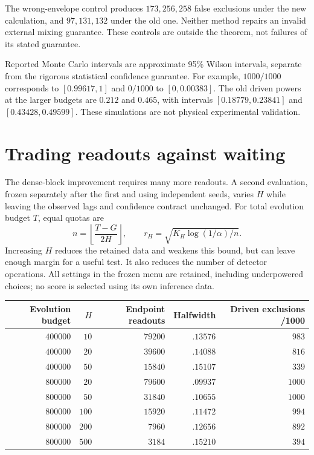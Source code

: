 The wrong-envelope control produces $173,256,258$ false exclusions under the
new calculation, and $97,131,132$ under the old one. Neither method repairs
an invalid external mixing guarantee. These controls are outside the theorem,
not failures of its stated guarantee.

Reported Monte Carlo intervals are approximate 95\% Wilson intervals,
separate from the rigorous statistical confidence guarantee. For example,
$1000/1000$ corresponds to $[0.99617,1]$ and $0/1000$ to $[0,0.00383]$.
The old driven powers at the larger budgets are $0.212$ and $0.465$, with
intervals $[0.18779,0.23841]$ and $[0.43428,0.49599]$.
These simulations are not physical experimental validation.

\section{Trading readouts against waiting}
The dense-block improvement requires many more readouts. A second evaluation,
frozen separately after the first and using independent seeds, varies $H$
while leaving the observed lags and confidence contract unchanged. For total
evolution budget $T$, equal quotas are
\[
 n=\left\lfloor\frac{T-G}{2H}\right\rfloor,
 \qquad r_H=\sqrt{K_H\log(1/\alpha)/n}.
\]
Increasing $H$ reduces the retained data and weakens this bound, but can leave
enough margin for a useful test. It also reduces the number of detector
operations. All settings in the frozen menu are retained, including
underpowered choices; no score is selected using its own inference data.

\begin{center}
\begin{tabular}{r|r|r|r|r}
Evolution budget & $H$ & Endpoint readouts & Halfwidth & Driven exclusions /1000\\\hline
$400000$ & $10$ & $79200$ & $.13576$ & $983$\\
$400000$ & $20$ & $39600$ & $.14088$ & $816$\\
$400000$ & $50$ & $15840$ & $.15107$ & $339$\\
$800000$ & $20$ & $79600$ & $.09937$ & $1000$\\
$800000$ & $50$ & $31840$ & $.10655$ & $1000$\\
$800000$ & $100$ & $15920$ & $.11472$ & $994$\\
$800000$ & $200$ & $7960$ & $.12656$ & $892$\\
$800000$ & $500$ & $3184$ & $.15210$ & $394$
\end{tabular}
\end{center}

